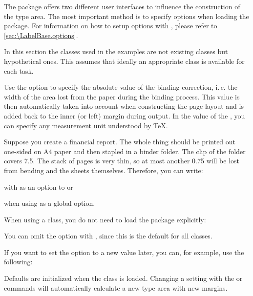 The  package offers two different user interfaces to
influence the construction of the type area. The most important method is to
specify options when loading the package. For information on how to setup
options with \KOMAScript, please refer to \autoref{sec:\LabelBase.options}.

In this section the classes used in the examples are not
existing {\KOMAScript} classes but hypothetical ones. This
 assumes that ideally an appropriate class is available
for each task.

\begin{Declaration}
\end{Declaration}%
Use the 
option to specify the absolute value of the binding correction, i.\,e. the width of the area lost
from the paper during the binding process. This value is then automatically
taken into account when constructing the page layout and is added back to the
inner (or left) margin during output. In the value of the ,
you can specify any measurement unit understood by \TeX{}.

\begin{Example}
  Suppose you create a financial report. The whole thing should be printed out
  one-sided on A4 paper and then stapled in a binder folder. The clip of the
  folder covers 7.5. The stack of pages is very thin, so at most
  another 0.75 will be lost from bending and the sheets themselves.
  Therefore, you can write:
  with  as an option to  or
  when using  as a global option.

  When using a {\KOMAScript} class, you do not need to load the
   package explicitly:
  You can omit the  option  with , since this
  is the default for all {\KOMAScript} classes.

  If you want to set the option to a new value later, you can, for example,
  use the following:
  Defaults are initialized when the  class is loaded.
  Changing a setting with the  or
   commands will automatically calculate a
  new type area with new margins.
\end{Example}

